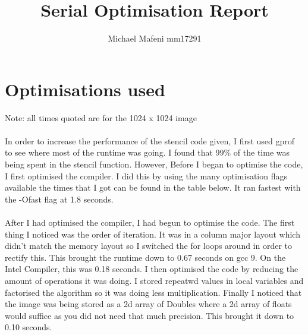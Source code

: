 \documentclass{article}
\title{Serial Optimisation Report}
\author{Michael Mafeni mm17291}
\date{}
\begin{document}
    \maketitle
    \newpage
    \section{Optimisations used}
        Note: all times quoted are for the 1024 x 1024 image
        \paragraph{}
        In order to increase the performance of the stencil code given, I first used gprof to see where most of the runtime was going. I found that 99\% of the time was being spent in the stencil function. However, Before I began to optimise the code, I first optimised the compiler. I did this by using the many optimisation flags available the times that I got can be found in the table below. It ran fastest with the -Ofast flag at 1.8 seconds.
        \paragraph{}
        After I had optimised the compiler, I had begun to optimise the code. The first thing I noticed was the order of iteration. It was in a column major layout which didn't match the memory layout so I switched the for loops around in order to rectify this. This brought the runtime down to 0.67 seconds on gcc 9. On the Intel Compiler, this was 0.18 seconds. I then optimised the code by reducing the amount of operations it was doing. I stored repeatwd values in local variables and factorised the algorithm so it was doing less multiplication. Finally I noticed that the image was being stored as a 2d array of Doubles where a 2d array of floats would suffice as you did not need that much precision. This brought it down to 0.10 seconds.
\end{document}
